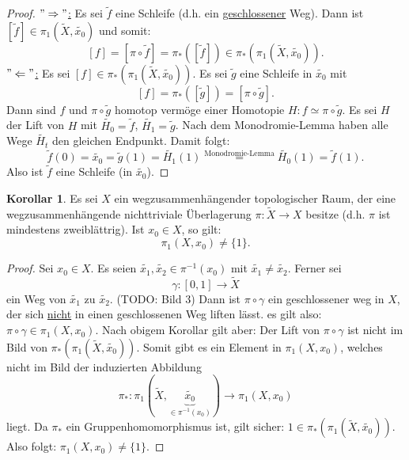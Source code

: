 \documentclass[a4paper,11pt,notitlepage]{report}
\theoremstyle{definition}
\newtheorem{corollary}{Korollar}[chapter]
\begin{document}
\begin{proof}
	\underline{$"\Rightarrow"$:} Es sei $\widetilde{f}$ eine Schleife (d.h. ein \underline{geschlossener} Weg). Dann ist $[\widetilde{f}] \in \pi_1(\widetilde{X}, \widetilde{x_0})$ und somit:
	$$[f] = [\pi \circ \widetilde{f}] = \pi_*([\widetilde{f}]) \in \pi_*(\pi_1(\widetilde{X}, \widetilde{x_0})).$$
	\underline{$"\Leftarrow"$:} Es sei $[f] \in \pi_*(\pi_1(\widetilde{X}, \widetilde{x_0}))$.
	\newline
	Es sei $\widetilde{g}$ eine Schleife in $\widetilde{x_0}$ mit
	$$[f] = \pi_*([\widetilde{g}]) = [\pi \circ \widetilde{g}].$$
	Dann sind $f$ und $\pi \circ \widetilde{g}$ homotop vermöge einer Homotopie $H \colon f \simeq \pi \circ \widetilde{g}$. Es sei $H$ der Lift von $H$ mit $\widetilde{H_0} = \widetilde{f}$, $\widetilde{H_1} = \widetilde{g}$.
	\newline
	Nach dem Monodromie-Lemma haben alle Wege $\widetilde{H_t}$ den gleichen Endpunkt. Damit folgt:
	$$\widetilde{f}(0) = \widetilde{x_0} = \widetilde{g}(1) = \widetilde{H_1}(1) \overset{\text{Monodromie-Lemma}}{=} \widetilde{H_0}(1) = \widetilde{f}(1).$$
	Also ist $\widetilde{f}$ eine Schleife (in $\widetilde{x_0}$).
\end{proof}

\begin{corollary}
	Es sei $X$ ein wegzusammenhängender topologischer Raum, der eine wegzusammenhängende nichttriviale Überlagerung $\pi \colon \widetilde{X} \rightarrow X$ besitze (d.h. $\pi$ ist mindestens zweiblättrig). Ist $x_0 \in X$, so gilt:
	$$\pi_1(X,x_0) \neq \{1\}.$$
\end{corollary}

\begin{proof}
	Sei $x_0 \in X$. Es seien $\widetilde{x_1}, \widetilde{x_2} \in \pi^{-1}(x_0)$ mit $\widetilde{x_1} \neq \widetilde{x_2}$. Ferner sei
	$$\gamma \colon [0,1] \rightarrow \widetilde{X}$$ ein Weg von $\widetilde{x_1}$ zu $\widetilde{x_2}$.
	(TODO: Bild 3) \newline
	Dann ist $\pi \circ \gamma$ ein geschlossener weg in $X$, der sich \underline{nicht} in einen geschlossenen Weg liften lässt. es gilt also: $\pi \circ \gamma \in \pi_1(X,x_0)$. Nach obigem Korollar gilt aber: Der Lift von $\pi \circ \gamma$ ist nicht im Bild von $\pi_*(\pi_1(\widetilde{X}, \widetilde{x_0}))$. Somit gibt es ein Element in $\pi_1(X,x_0)$, welches nicht im Bild der induzierten Abbildung 
	$$\pi_* \colon \pi_1(\widetilde{X}, \underbrace{\widetilde{x_0}}_{\in \pi^{-1}(x_0)}) \rightarrow \pi_1(X,x_0)$$ liegt.
	\newline
	Da $\pi_*$ ein Gruppenhomomorphismus ist, gilt sicher: $1 \in \pi_*(\pi_1(\widetilde{X},\widetilde{x_0}))$.
	\newline
	Also folgt: $\pi_1(X,x_0) \neq \{1\}$.
\end{proof}
\end{document}
